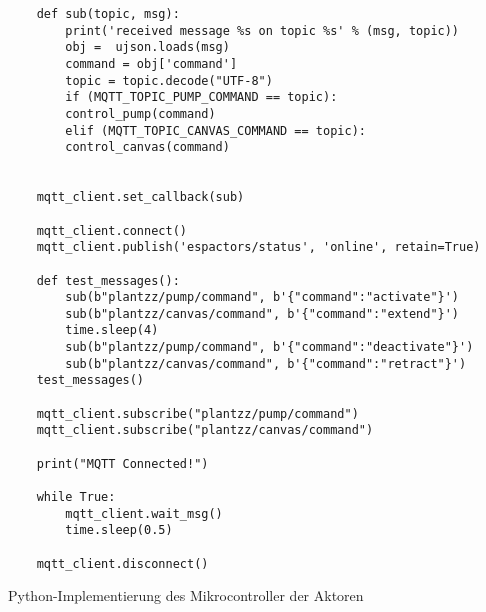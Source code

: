 \begin{listing}[!ht]
\begin{verbatim}
    def sub(topic, msg):
        print('received message %s on topic %s' % (msg, topic))
        obj =  ujson.loads(msg)
        command = obj['command']
        topic = topic.decode("UTF-8")
        if (MQTT_TOPIC_PUMP_COMMAND == topic):
        control_pump(command)
        elif (MQTT_TOPIC_CANVAS_COMMAND == topic):
        control_canvas(command)
        
    
    mqtt_client.set_callback(sub)
    
    mqtt_client.connect()
    mqtt_client.publish('espactors/status', 'online', retain=True)
    
    def test_messages():
        sub(b"plantzz/pump/command", b'{"command":"activate"}')
        sub(b"plantzz/canvas/command", b'{"command":"extend"}')
        time.sleep(4)
        sub(b"plantzz/pump/command", b'{"command":"deactivate"}')
        sub(b"plantzz/canvas/command", b'{"command":"retract"}')
    test_messages()
    
    mqtt_client.subscribe("plantzz/pump/command")
    mqtt_client.subscribe("plantzz/canvas/command")
    
    print("MQTT Connected!")
    
    while True:
        mqtt_client.wait_msg()
        time.sleep(0.5)
    
    mqtt_client.disconnect()
\end{verbatim}
\caption{Python-Implementierung des Mikrocontroller der Aktoren}
\label{list:wokwi_aktoren}
\end{listing}